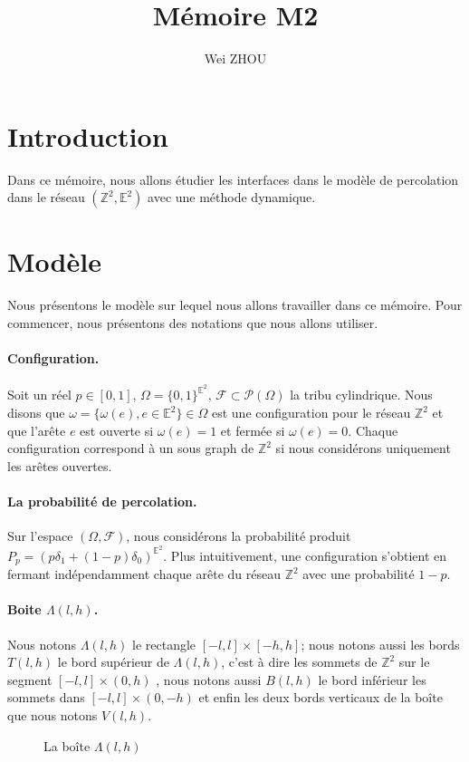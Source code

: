 \documentclass[titlepage,a4paper,12pt]{article}
\title{Mémoire M2}
\author{Wei ZHOU}
\newcounter{cor}
\begin{document}
\maketitle

\section{Introduction}
 Dans ce mémoire, nous allons étudier les interfaces dans le modèle de percolation dans le réseau $(\mathbb{Z}^2,\mathbb{E}^2)$ avec une méthode dynamique.

\section{Modèle}
Nous présentons le modèle sur lequel nous allons travailler dans ce mémoire. Pour commencer, nous présentons des notations que nous allons utiliser.

\paragraph{Configuration.} Soit un réel $p\in [0,1]$, $\Omega = \{0,1\}^{\mathbb{E}^2}$, $\mathcal{F}\subset \mathcal{P}(\Omega)$ la tribu cylindrique. Nous disons que $\omega = \{\omega(e), e\in \mathbb{E}^2\} \in \Omega$ est une configuration pour le réseau $\mathbb{Z}^2$ et que l'arête $e$ est ouverte si $\omega(e) = 1$ et fermée si $\omega(e)= 0$. Chaque configuration correspond à un sous graph de $\mathbb{Z}^2$ si nous considérons uniquement les arêtes ouvertes.
\paragraph{La probabilité de percolation.} Sur l'espace $(\Omega, \mathcal{F})$, nous considérons la probabilité produit $P_p = (p\delta_1 +(1-p)\delta_0)^{\mathbb{E}^2}$. Plus intuitivement, une configuration s'obtient en fermant indépendamment chaque arête du réseau $\mathbb{Z}^2$ avec une probabilité $1-p$. 

\paragraph{Boite $\Lambda(l,h)$.}Nous notons $\Lambda(l,h)$ le rectangle $[-l,l]\times[-h,h]$;  nous notons aussi les bords $T(l,h)$ le bord supérieur de $\Lambda(l,h)$, c'est à dire les sommets de $\mathbb{Z}^2$ sur le segment $[-l,l]\times(0,h)$ , nous notons aussi $B(l,h)$ le bord inférieur les sommets dans $[-l,l]\times(0,-h)$ et enfin les deux bords verticaux de la boîte que nous notons $V(l,h)$.
\begin{figure}[h]
\center
{}
\caption{La boîte $\Lambda(l,h)$}
\end{figure}
\end{document}

